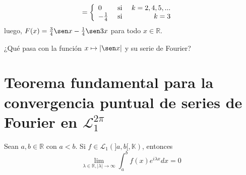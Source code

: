 \documentclass[12pt]{report}
\newcounter{it}
\theoremstyle{largebreak}
\newcommand\abs[1]{\ensuremath{\left|#1\right|}}
\begin{document}
\begin{exa}
\begin{equation*}
\begin{split}
                &=\left\{
                    \begin{array}{lcr}
                        0 & \textup{ si } & k=2,4,5,...\\
                        -\frac{1}{4} & \textup{ si } & k=3\\
                    \end{array}
                \right.
            \end{split}
        \end{equation*}
        luego, $F(x)=\frac{3}{4}\sen x-\frac{1}{4}\sen 3x$ para todo $x\in\mathbb{R}$.
    \end{exa}

    \begin{exa}
        ¿Qué pasa con la función $x\mapsto\abs{\sen x}$ y su serie de Fourier?
    \end{exa}

    \section{Teorema fundamental para la convergencia puntual de series de Fourier en $\mathcal{L}_1^{2\pi}$}

    \begin{theor}
        Sean $a,b\in\mathbb{R}$ con $a<b$. Si $f\in\mathcal{L}_1(]a,b[,\mathbb{K})$, entonces
        \begin{equation*}
            \lim_{\lambda\in\mathbb{R},|\lambda|\rightarrow\infty }\int_{a}^bf(x)e^{ i\lambda x}dx=0
        \end{equation*}
    \end{theor}
\end{document}
